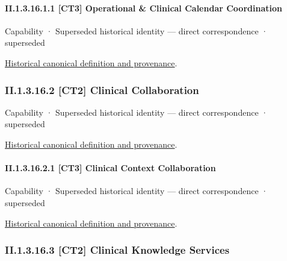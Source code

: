 \paragraph*{II.1.3.16.1.1 [CT3] Operational \& Clinical Calendar Coordination}
\label{navigation:II.1.3.16.1.1}

\label{element:c0f6e5f7f5a94d1580fa6e0e8b82c93a}
{\small Capability · Superseded historical identity — direct correspondence · superseded}\par
\href{../../../../continuum/strategy/capability/c0f6e5f7f5a94d1580fa6e0e8b82c93a.md}{Historical canonical definition and provenance}.\par
\subsubsection*{II.1.3.16.2 [CT2] Clinical Collaboration}
\label{navigation:II.1.3.16.2}

\label{element:c5adc1955b6046d8b920b0176cebc9de}
{\small Capability · Superseded historical identity — direct correspondence · superseded}\par
\href{../../../../continuum/strategy/capability/c5adc1955b6046d8b920b0176cebc9de.md}{Historical canonical definition and provenance}.\par
\paragraph*{II.1.3.16.2.1 [CT3] Clinical Context Collaboration}
\label{navigation:II.1.3.16.2.1}

\label{element:750ef0d8e1504a8e9a1fde9bf13a6d0c}
{\small Capability · Superseded historical identity — direct correspondence · superseded}\par
\href{../../../../continuum/strategy/capability/750ef0d8e1504a8e9a1fde9bf13a6d0c.md}{Historical canonical definition and provenance}.\par
\subsubsection*{II.1.3.16.3 [CT2] Clinical Knowledge Services}
\label{navigation:II.1.3.16.3}

